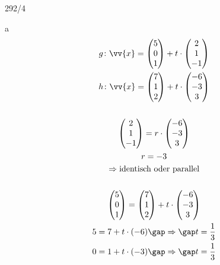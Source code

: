 \begin{exercise}{292/4}
  \item [a]
  \begin{gather*}
    g \colon \vv{x} = \begin{pmatrix}5 \\ 0 \\ 1\end{pmatrix} + t \cdot \begin{pmatrix}2 \\ 1 \\ -1\end{pmatrix} \\
    h \colon \vv{x} = \begin{pmatrix}7 \\ 1 \\ 2\end{pmatrix} + t \cdot \begin{pmatrix}-6 \\ -3 \\ 3\end{pmatrix} \\\\
    \begin{pmatrix}2 \\ 1 \\ -1\end{pmatrix} = r \cdot \begin{pmatrix}-6 \\ -3 \\ 3\end{pmatrix} \\
    r = -3 \\
    \Rightarrow \text{identisch oder parallel} \\\\
    \begin{pmatrix}5 \\ 0 \\ 1\end{pmatrix} = \begin{pmatrix}7 \\ 1 \\ 2\end{pmatrix} + t \cdot \begin{pmatrix}-6 \\ -3 \\ 3\end{pmatrix} \\
    5 = 7 + t \cdot (-6) \gap\Rightarrow\gap t = \frac{1}{3} \\
    0 = 1 + t \cdot (-3) \gap\Rightarrow\gap t = \frac{1}{3} \\

\end{gather*}
\end{exercise}
